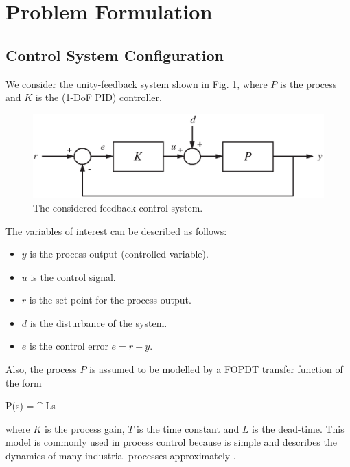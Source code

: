 %
\section{Problem Formulation}
%

\subsection{Control System Configuration}

We consider the unity-feedback system shown in Fig. \ref{1DOF},
where $P$ is the process and $K$ is the (1-DoF PID) controller.

\begin{figure}[h!]
    \begin{center}
        \includegraphics[width=0.6\linewidth]{1dof-3.eps}
        \caption{The considered feedback control system.}\label{1DOF}
    \end{center}
\end{figure}

The variables of interest can be described as follows:

\begin{itemize}

\item $y$ is the process output (controlled variable).

\item $u$ is the control signal.

\item $r$ is the set-point for the process output.

\item $d$ is the disturbance of the system.

\item $e$ is the control error $e=r-y$.

\end{itemize}

Also, the process $P$ is assumed to be modelled by a FOPDT
transfer function of the form

\be P(s) = \me^{-Ls} \label{fopdt} \ee

\noindent where $K$ is the process gain, $T$ is the time constant
and $L$ is the dead-time. This model is commonly used in process
control because is simple and describes the dynamics of many
industrial processes approximately \cite{Astrombook06}.

